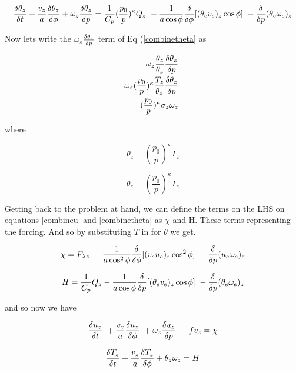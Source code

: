 \documentclass{article}
\begin{document}
\begin{equation}
\frac{\delta \theta_z}{\delta t} + \frac {v_z}{a} \frac{\delta \theta_z}{\delta \phi}
+ \omega_z \frac{\delta \theta_z}{\delta p}
= \frac{1}{C_p} (\frac{p_0}{p})^\kappa Q_z \
- \frac{1}{a\cos{\phi}} \frac{\delta}{\delta \phi} [ (\theta_e v_e)_z \cos {\phi} ] \
- \frac{\delta}{\delta p} (\theta_e \omega_e )_z
\label{combinetheta}
\end{equation}

Now lets write the $\omega_z\frac{\delta \theta_z}{\delta p}$ term of Eq (\ref{combinetheta} as

\begin{eqnarray}
\omega_z \frac{\theta_z}{\theta_z} \frac{\delta \theta_z}{\delta p} \
\nonumber\\
\omega_z (\frac{p_0}{p})^\kappa \frac{T_z}{\theta_z}\frac{\delta \theta_z}{\delta p} \
\nonumber\\
(\frac{p_0}{p})^\kappa \sigma_z \omega_z \
\nonumber
\end{eqnarray}

where

\begin{equation}
\theta_z =  (\frac{p_0}{p})^\kappa T_z
\end{equation}

\begin{equation}
\theta_e =  (\frac{p_0}{p})^\kappa T_e
\end{equation}

Getting back to the problem at hand, we can define the terms on the LHS on
equations \ref{combineu} and \ref{combinetheta} as $\chi$ and H. These
terms representing the forcing. And so by
substituting $T$ in for $\theta$ we get.

\begin{equation}
\chi =  F_{\lambda z} \
- \frac{1}{a\cos^2{\phi}} \frac{\delta}{\delta \phi} [ ( v_e u_e )_z \cos^2 \phi ] \
- \frac{\delta}{\delta p} (u_e \omega_e )_z
\end{equation}

\begin{equation}
H = \frac{1}{C_p} Q_z - \frac{1}{a\cos{\phi}} \frac{\delta}{\delta p} [ (\theta_e v_e)_z \cos {\phi} ] \
- \frac{\delta}{\delta p} (\theta_e \omega_e )_z
\end{equation}

and so now we have

\begin{equation}
\frac{\delta u_z}{\delta t} \
+ \frac{v_z}{a} \frac{\delta u_z}{\delta \phi} \
+ \omega_z \frac{\delta u_z}{\delta p} \
- fv_z = \chi
\label{four}
\end{equation}

\begin{equation}
\frac{\delta T_z}{\delta t} + \frac{v_z}{a} \frac{\delta T_z}{\delta \phi} + \theta_z \omega_z = H
\label{five}
\end{equation}
\end{document}
